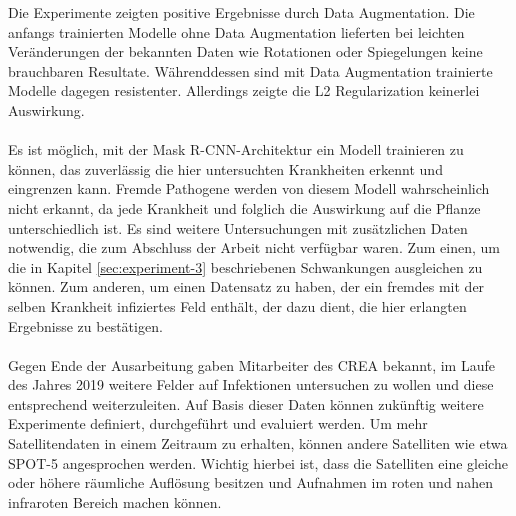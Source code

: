 Die Experimente zeigten positive Ergebnisse durch Data Augmentation. Die anfangs trainierten Modelle ohne Data Augmentation lieferten bei leichten Veränderungen der bekannten Daten wie Rotationen oder Spiegelungen keine brauchbaren Resultate. Währenddessen sind mit Data Augmentation trainierte Modelle dagegen resistenter. Allerdings zeigte die L2 Regularization keinerlei Auswirkung.
\\\\
Es ist möglich, mit der Mask R-CNN-Architektur ein Modell trainieren zu können, das zuverlässig die hier untersuchten Krankheiten erkennt und eingrenzen kann. Fremde Pathogene werden von diesem Modell wahrscheinlich nicht erkannt, da jede Krankheit und folglich die Auswirkung auf die Pflanze unterschiedlich ist. Es sind weitere Untersuchungen mit zusätzlichen Daten notwendig, die zum Abschluss der Arbeit nicht verfügbar waren. Zum einen, um die in Kapitel \ref{sec:experiment-3} beschriebenen Schwankungen ausgleichen zu können. Zum anderen, um einen Datensatz zu haben, der ein fremdes mit der selben Krankheit infiziertes Feld enthält, der dazu dient, die hier erlangten Ergebnisse zu bestätigen. 
\\\\
Gegen Ende der Ausarbeitung gaben Mitarbeiter des CREA bekannt, im Laufe des Jahres 2019 weitere Felder auf Infektionen untersuchen zu wollen und diese entsprechend weiterzuleiten. Auf Basis dieser Daten können zukünftig weitere Experimente definiert, durchgeführt und evaluiert werden. Um mehr Satellitendaten in einem Zeitraum zu erhalten, können andere Satelliten wie etwa SPOT-5 angesprochen werden. Wichtig hierbei ist, dass die Satelliten eine gleiche oder höhere räumliche Auflösung besitzen und Aufnahmen im roten und nahen infraroten Bereich machen können. 
